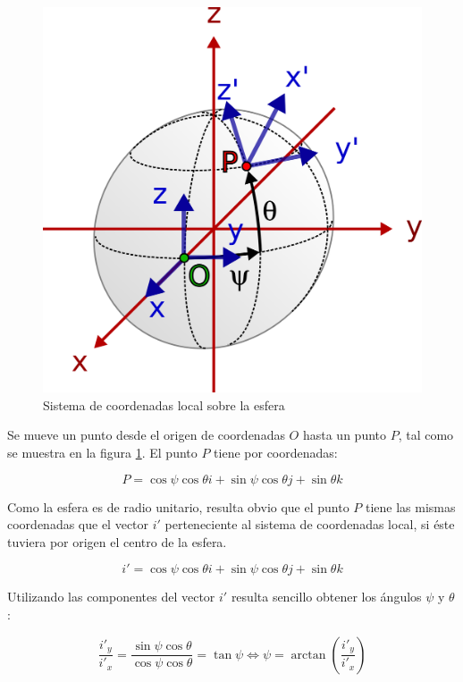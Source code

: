 \documentclass[12pt, a4paper]{report}
\begin{document}
\begin{figure}[h]
	\centering
		\includegraphics[scale=0.85]{../img/sphere.png} 
	\caption{Sistema de coordenadas local sobre la esfera}
	\label{fig: esfera_coordenadas}
\end{figure}

Se mueve un punto desde el origen de coordenadas $O$ hasta un punto $P$, tal como se muestra en la figura \ref{fig: esfera_coordenadas}. El punto $P$ tiene por coordenadas:

$$ P = \cos \psi \cos \theta i + \sin \psi \cos \theta j + \sin \theta k$$

Como la esfera es de radio unitario, resulta obvio que el punto $P$ tiene las mismas coordenadas que el vector $i'$ perteneciente al sistema de coordenadas local, si éste tuviera por origen el centro de la esfera.

\begin{equation} \label{eq: E13}
i' = \cos \psi \cos \theta i + \sin \psi \cos \theta j + \sin \theta k
\end{equation}

Utilizando las componentes del vector $i'$ resulta sencillo obtener los ángulos $\psi$ y $\theta$:

\begin{equation}
\frac{i'_y}{i'_x} =  \frac{\sin \psi \cos \theta}{\cos \psi \cos \theta} = \tan{\psi} \iff \psi = \arctan \left( \frac{i'_y}{i'_x} \right)
\end{equation}
\end{document}
